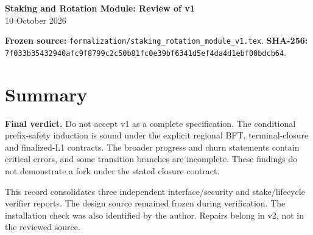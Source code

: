 \documentclass[11pt,a4paper]{article}
\begin{document}
\begin{center}
{\Large\bfseries Staking and Rotation Module: Review of v1}\\[4pt]
10 October 2026
\end{center}
\textbf{Frozen source:} \texttt{formalization/staking\_rotation\_module\_v1.tex}.
\textbf{SHA-256:}\\
\texttt{7f033b35432940afc9f8799c2c50b81fc0e39bf6341d5ef4da4d1ebf00bdcb64}.

\section*{Summary}
\textbf{Final verdict.} Do not accept v1 as a complete specification.
The conditional prefix-safety induction is sound under the explicit
regional BFT, terminal-closure and finalized-L1 contracts. The broader
progress and churn statements contain critical errors, and some transition
branches are incomplete. These findings do not demonstrate a fork under
the stated closure contract.

This record consolidates three independent interface/security and stake/lifecycle
verifier reports. The design source remained frozen during verification.
The installation check was also identified by the author. Repairs
belong in v2, not in the reviewed source.
\end{document}
